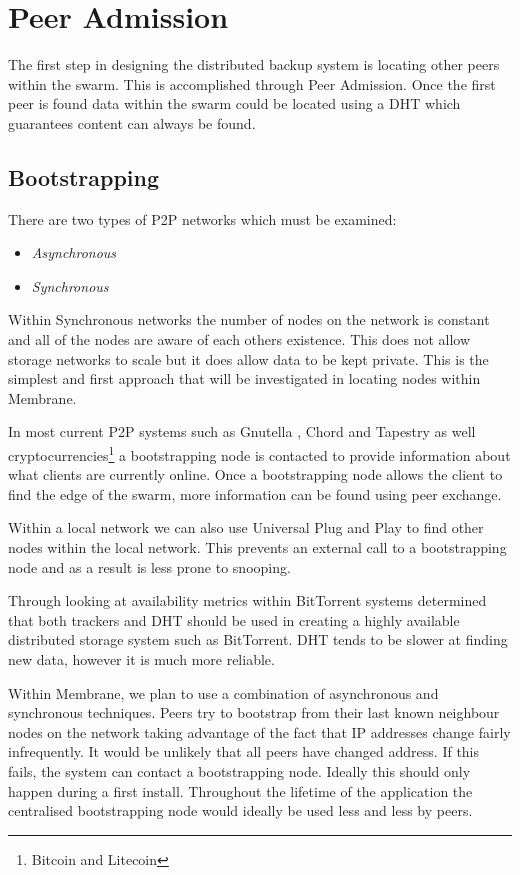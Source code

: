 \documentclass[11pt, a4paper, twoside]{report}
\begin{document}
\section{Peer Admission}

The first step in designing the distributed backup system is locating other peers within the swarm. This is accomplished through Peer Admission. Once the first peer is found data within the swarm could be located using a DHT which guarantees content can always be found.

\subsection{Bootstrapping}

There are two types of P2P networks which must be examined:

\begin{itemize}
 \item \emph{Asynchronous}
 \item \emph{Synchronous}
\end{itemize}

Within Synchronous networks the number of nodes on the network is constant and all of the nodes are aware of each others existence. This does not allow storage networks to scale but it does allow data to be kept private. \citep{saxena2003admission} This is the simplest and first approach that will be investigated in locating nodes within Membrane.

In most current P2P systems such as Gnutella \citep{klingberg2002gnutella}, Chord and Tapestry as well cryptocurrencies\footnote{Bitcoin and Litecoin} a bootstrapping node is contacted to provide information about what clients are currently online. Once a bootstrapping node allows the client to find the edge of the swarm, more information can be found using peer exchange.

Within a local network we can also use Universal Plug and Play to find other nodes within the local network. This prevents an external call to a bootstrapping node and as a result is less prone to snooping.

Through looking at availability metrics within BitTorrent systems \cite{neglia2007availability} determined that both trackers and DHT should be used in creating a highly available distributed storage system such as BitTorrent. DHT tends to be slower at finding new data, however it is much more reliable.

Within Membrane, we plan to use a combination of asynchronous and synchronous techniques. Peers try to bootstrap from their last known neighbour nodes on the network taking advantage of the fact that IP addresses change fairly infrequently. It would be unlikely that all peers have changed address. If this fails, the system can contact a bootstrapping node. Ideally this should only happen during a first install. Throughout the lifetime of the application the centralised bootstrapping node would ideally be used less and less by peers.
\end{document}
